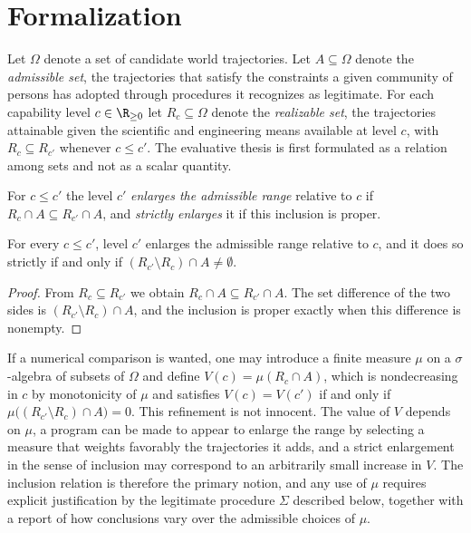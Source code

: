 \section*{Formalization}

Let $\Omega$ denote a set of candidate world trajectories. Let $A\subseteq\Omega$ denote the \emph{admissible set}, the trajectories that satisfy the constraints a given community of persons has adopted through procedures it recognizes as legitimate. For each capability level $c\in\R_{\ge 0}$ let $R_c\subseteq\Omega$ denote the \emph{realizable set}, the trajectories attainable given the scientific and engineering means available at level $c$, with $R_c\subseteq R_{c'}$ whenever $c\le c'$. The evaluative thesis is first formulated as a relation among sets and not as a scalar quantity.

\begin{definition}
For $c\le c'$ the level $c'$ \emph{enlarges the admissible range} relative to $c$ if $R_c\cap A\subseteq R_{c'}\cap A$, and \emph{strictly enlarges} it if this inclusion is proper.
\end{definition}

\begin{proposition}
For every $c\le c'$, level $c'$ enlarges the admissible range relative to $c$, and it does so strictly if and only if $(R_{c'}\setminus R_c)\cap A\neq\emptyset$.
\end{proposition}

\begin{proof}
From $R_c\subseteq R_{c'}$ we obtain $R_c\cap A\subseteq R_{c'}\cap A$. The set difference of the two sides is $(R_{c'}\setminus R_c)\cap A$, and the inclusion is proper exactly when this difference is nonempty.
\end{proof}

\begin{remark}
If a numerical comparison is wanted, one may introduce a finite measure $\mu$ on a $\sigma$-algebra of subsets of $\Omega$ and define $V(c)=\mu(R_c\cap A)$, which is nondecreasing in $c$ by monotonicity of $\mu$ and satisfies $V(c)=V(c')$ if and only if $\mu\big((R_{c'}\setminus R_c)\cap A\big)=0$. This refinement is not innocent. The value of $V$ depends on $\mu$, a program can be made to appear to enlarge the range by selecting a measure that weights favorably the trajectories it adds, and a strict enlargement in the sense of inclusion may correspond to an arbitrarily small increase in $V$. The inclusion relation is therefore the primary notion, and any use of $\mu$ requires explicit justification by the legitimate procedure $\Sigma$ described below, together with a report of how conclusions vary over the admissible choices of $\mu$.
\end{remark}

